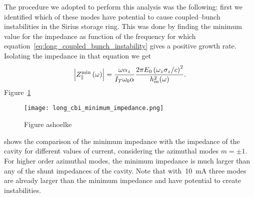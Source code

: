     The procedure we adopted to perform this analysis was the following: first we identified which of these modes have potential to cause coupled--bunch instabilities in the Sirius storage ring. This was done by finding the minimum value for the impedance as function of the frequency for which equation~\eqref{eq:long_coupled_bunch_instability} gives a positive growth rate. Isolating the impedance in that equation we get
    \begin{align}\label{eq:long_cbi_minimum_impedance}
        \left|Z_\parallel^\text{min}\left(\omega\right)\right| = \frac{\omega\alpha_z}{I_T\omega_0\alpha}\frac{2\pi E_0\left(\omega_z\sigma_z/c\right)^2}{h_m^2(\omega)}.
    \end{align}
    Figure~\ref{fig:long_cbi_minimum_impedance}
    \begin{figure}
        \centering
        \texttt{[image: long\_cbi\_minimum\_impedance.png]}
        \caption{Figure ashoelke}
        \label{fig:long_cbi_minimum_impedance}
    \end{figure}
    shows the comparison of the minimum impedance with the impedance of the cavity for different values of current, considering the azimuthal modes $m=\pm1$. For higher order azimuthal modes, the minimum impedance is much larger than any of the shunt impedances of the cavity. Note that with~\SI{10}{\milli\ampere} three modes are already larger than the minimum impedance and have potential to create instabilities.

